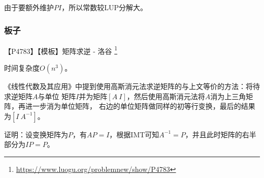 由于要额外维护$PI$，所以常数较LUP分解大。

\subsubsection{板子}

【P4783】【模板】矩阵求逆 - 洛谷
\footnote{\url{https://www.luogu.org/problemnew/show/P4783}}

时间复杂度$O(n^3)$。

《线性代数及其应用》中提到使用高斯消元法求逆矩阵的与上文等价的方法：将待求逆矩阵$A$与单位
矩阵$I$并为矩阵$[A~I]$，然后使用高斯消元法将$A$消为上三角矩阵，再进一步消为单位矩阵，
右边的单位矩阵做同样的初等行变换，最后的结果为$[I~A^{-1}]$。

证明：设变换矩阵为$P$，有$AP=I$，根据IMT可知$A^{-1}=P$，并且此时矩阵的右半部分为$IP=P$。
